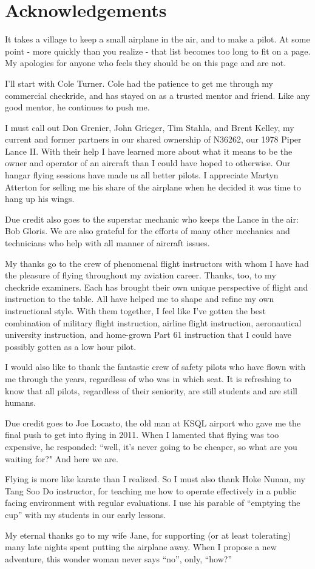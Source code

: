 \section*{Acknowledgements}

It takes a village to keep a small airplane in the air, and to make a pilot. At some point - more quickly than you realize - that list becomes
too long to fit on a page. My apologies for anyone who feels they should be on this page and are not.

I'll start with Cole Turner. Cole had the patience to get me through my commercial checkride, and has stayed on as
a trusted mentor and friend. Like any good mentor, he continues to push me.

I must call out Don Grenier, John Grieger, Tim Stahla, and Brent Kelley, my current and former partners in our shared ownership of N36262, our 1978 Piper Lance II. With their help I have learned more about what it means to be the owner and operator of an aircraft than I could have hoped to otherwise. Our hangar flying sessions have made us all better pilots. I appreciate Martyn Atterton for selling me his share of the airplane when he decided it was time to hang up his wings.

Due credit also goes to the superstar mechanic who keeps the Lance in the air: Bob Gloris. We are also grateful for the efforts of many other mechanics and technicians who help with all manner of aircraft issues.

My thanks go to the crew of phenomenal flight instructors with whom I have had the pleasure of flying throughout my aviation career. Thanks, too, to my checkride examiners. Each has brought their own unique perspective of flight and instruction to the table. All have helped me to shape and refine my own instructional style. With them together, I feel like I've gotten the best combination of military flight instruction, airline flight instruction, aeronautical university instruction, and home-grown Part 61 instruction that I could have possibly gotten as a low hour pilot.

I would also like to thank the fantastic crew of safety pilots who have flown with me through the years, regardless of who was in which seat. It is refreshing to know that all pilots, regardless of their seniority, are still students and are still humans.

Due credit goes to Joe Locasto, the old man at KSQL airport who gave me the final push to get into flying in 2011. When I lamented that flying was too expensive, he responded: ``well, it's never going to be cheaper, so what are you waiting for?" And here we are.

Flying is more like karate than I realized. So I must also thank Hoke Nunan, my Tang Soo Do instructor, for teaching me
how to operate effectively in a public facing environment with regular evaluations. I use his parable of
``emptying the cup'' with my students in our early lessons.

My eternal thanks go to my wife Jane, for supporting (or at least tolerating) many late nights spent putting the airplane away. When I propose a new adventure, this wonder woman never says ``no'', only, ``how?''


